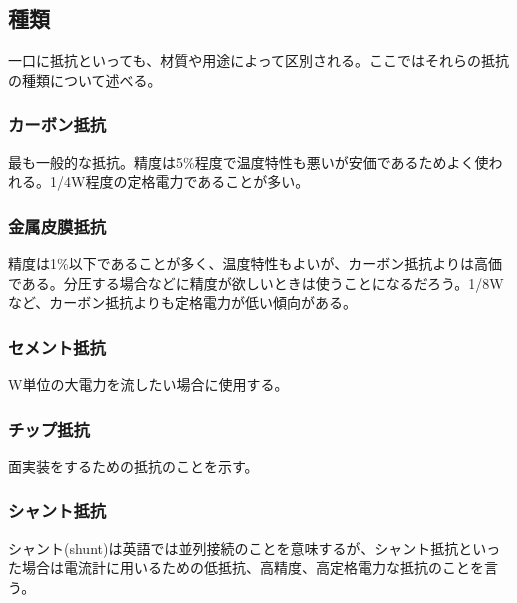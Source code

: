 \documentclass[a4paper,titlepage]{ujarticle}
\begin{document}
\subsection{種類}
一口に抵抗といっても、材質や用途によって区別される。ここではそれらの抵抗の種類について述べる。
\subsubsection{カーボン抵抗}
最も一般的な抵抗。精度は5\%程度で温度特性も悪いが安価であるためよく使われる。1/4W程度の定格電力であることが多い。
\subsubsection{金属皮膜抵抗}
精度は1\%以下であることが多く、温度特性もよいが、カーボン抵抗よりは高価である。分圧する場合などに精度が欲しいときは使うことになるだろう。1/8Wなど、カーボン抵抗よりも定格電力が低い傾向がある。
\subsubsection{セメント抵抗}
W単位の大電力を流したい場合に使用する。
\subsubsection{チップ抵抗}
面実装をするための抵抗のことを示す。
\subsubsection{シャント抵抗}
シャント(shunt)は英語では並列接続のことを意味するが、シャント抵抗といった場合は電流計に用いるための低抵抗、高精度、高定格電力な抵抗のことを言う。
\end{document}
